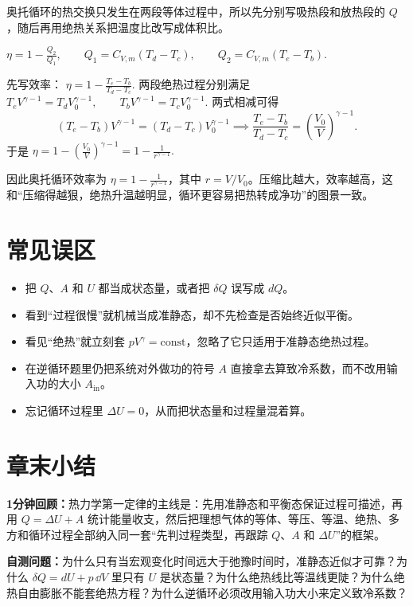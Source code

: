 \documentclass[lang=cn,11pt]{elegantbook}
\newcommand{\summaryline}[1]{\par\noindent\textbf{1分钟回顾：}#1\par}
\newcommand{\chapterselfcheck}[1]{\par\noindent\textbf{自测问题：}#1\par}
\begin{document}
\begin{solution}
奥托循环的热交换只发生在两段等体过程中，所以先分别写吸热段和放热段的 \(Q\)，随后再用绝热关系把温度比改写成体积比。

 \(\eta=1-\frac{Q_2}{Q_1},\qquad Q_1=C_{V,m}(T_d-T_c),\qquad Q_2=C_{V,m}(T_e-T_b).\) 

先写效率：
 \(\eta=1-\frac{T_e-T_b}{T_d-T_c}.\) 
两段绝热过程分别满足
 \(T_eV^{\gamma-1}=T_dV_0^{\gamma-1},\qquad T_bV^{\gamma-1}=T_cV_0^{\gamma-1}.\) 
两式相减可得
\[
(T_e-T_b)V^{\gamma-1}=(T_d-T_c)V_0^{\gamma-1}
\implies
\frac{T_e-T_b}{T_d-T_c}=\left(\frac{V_0}{V}\right)^{\gamma-1}.
\]
于是
 \(\eta=1-\left(\frac{V_0}{V}\right)^{\gamma-1} =1-\frac{1}{r^{\gamma-1}}.\) 

因此奥托循环效率为 \(\eta=1-\frac{1}{r^{\gamma-1}}\)，其中 \(r=V/V_0\)。压缩比越大，效率越高，这和“压缩得越狠，绝热升温越明显，循环更容易把热转成净功”的图景一致。
\end{solution}

\section{常见误区}

\begin{itemize}
 \item 把 \(Q\)、\(A\) 和 \(U\) 都当成状态量，或者把 \(\delta Q\) 误写成 \(dQ\)。
 \item 看到“过程很慢”就机械当成准静态，却不先检查是否始终近似平衡。
 \item 看见“绝热”就立刻套 \(pV^\gamma=\text{const}\)，忽略了它只适用于准静态绝热过程。
 \item 在逆循环题里仍把系统对外做功的符号 \(A\) 直接拿去算致冷系数，而不改用输入功的大小 \(A_{\text{in}}\)。
 \item 忘记循环过程里 \(\Delta U=0\)，从而把状态量和过程量混着算。
\end{itemize}

\section{章末小结}

\summaryline{热力学第一定律的主线是：先用准静态和平衡态保证过程可描述，再用 \(Q=\Delta U+A\) 统计能量收支，然后把理想气体的等体、等压、等温、绝热、多方和循环过程全部纳入同一套“先判过程类型，再跟踪 \(Q\)、\(A\) 和 \(\Delta U\)”的框架。}
\chapterselfcheck{为什么只有当宏观变化时间远大于弛豫时间时，准静态近似才可靠？为什么 \(\delta Q=dU+p\,\dd V\) 里只有 \(U\) 是状态量？为什么绝热线比等温线更陡？为什么绝热自由膨胀不能套绝热方程？为什么逆循环必须改用输入功大小来定义致冷系数？}
\end{document}
